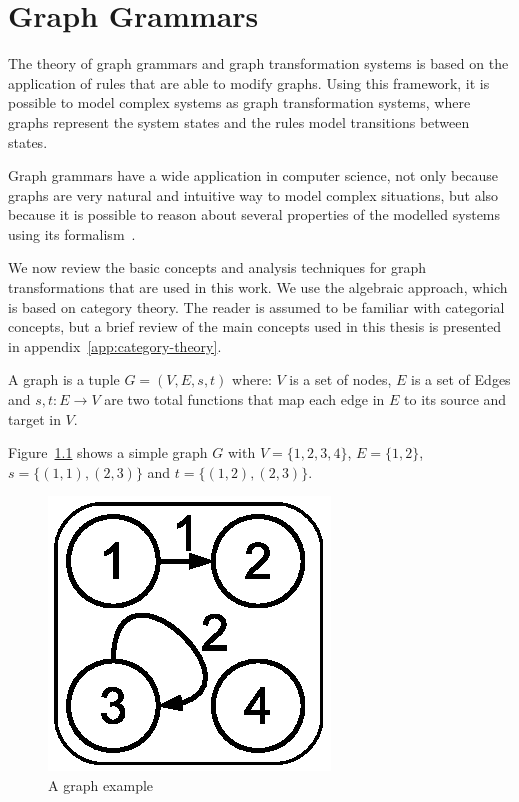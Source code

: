 \chapter{Graph Grammars}\label{ch:gts}

The theory of graph grammars and graph transformation systems is based on the application of rules that are able to modify graphs. Using this framework, it is possible to model complex systems as graph transformation systems, where graphs represent the system states and the rules model transitions between states.

Graph grammars have a wide application in computer science, not only because graphs are very natural and intuitive way to model complex situations, but also because it is possible to reason about several properties of the modelled systems using its formalism~\cite{Ehrig2006,Rozenberg1997}.

We now review the basic concepts and analysis techniques for graph transformations that are used in this work. We use the algebraic approach, which is based on category theory. The reader is assumed to be familiar with categorial concepts, but a brief review of the main concepts used in this thesis is presented in appendix~\ref{app:category-theory}.

\begin{definition}[Graph] A graph is a tuple $G = \left(V,E,s,t\right)$ where: $V$ is a set of nodes, $E$ is a set of Edges and $s,t : E \rightarrow V$ are two total functions that map each edge in $E$ to its source and target in $V$.

\end{definition}

\begin{example}[Graph]\label{def:graph} Figure~\ref{fig:gts:graph} shows a simple graph $G$ with $V = \{1,2,3,4\}$, $E = \{1,2\}$, $s =\{(1,1),(2,3)\}$ and $t = \{(1,2),(2,3)\}$.
\begin{figure}[!ht]
  \centering
  \includegraphics[scale=0.6]{images/gts/graph}
  \caption{A graph example}\label{fig:gts:graph}
\end{figure}
\end{example}

